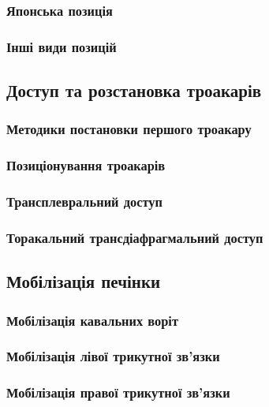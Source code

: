\begin{refsection}
\subsubsection{Японська позиція}

\subsubsection{Інші види позицій}

\subsection{Доступ та розстановка троакарів}

\subsubsection{Методики постановки першого троакару}

\subsubsection{Позиціонування троакарів}

\subsubsection{Трансплевральний доступ}

\subsubsection{Торакальний трансдіафрагмальний доступ}

\subsection{Мобілізація печінки}

\subsubsection{Мобілізація кавальних воріт}

\subsubsection{Мобілізація лівої трикутної зв'язки}

\subsubsection{Мобілізація правої трикутної зв'язки}


\end{refsection}
